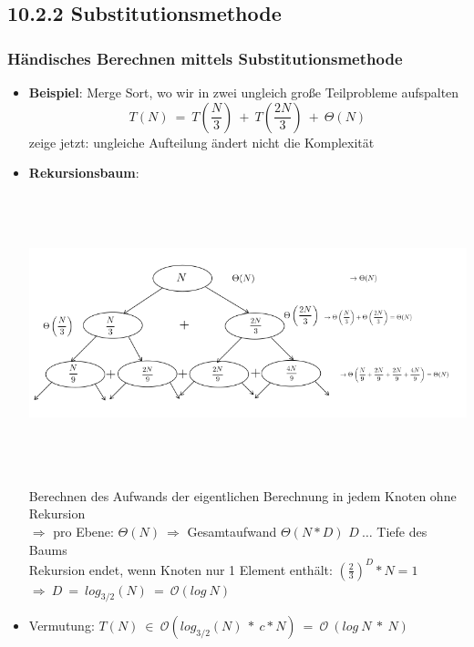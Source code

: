 \documentclass[11pt, fleqn]{scrreprt}
\begin{document}
	\subsection*{10.2.2 Substitutionsmethode}
	\subsubsection*{Händisches Berechnen mittels Substitutionsmethode}
	\begin{itemize}
		\item \textbf{Beispiel}: Merge Sort, wo wir in zwei ungleich große Teilprobleme aufspalten \\
		\[ T(N)\ =\ T\left(\frac{N}{3}\right)\ +\ T\left(\frac{2N}{3}\right)\ +\ \Theta(N)\]
		zeige jetzt: ungleiche Aufteilung ändert nicht die Komplexität
		\item \textbf{Rekursionsbaum}:\\
		\begin{center}
		\includegraphics[width=15cm,height=8cm,keepaspectratio]{./Pictures/Substitutionsmethode.png}
		\end{center}
		Berechnen des Aufwands der eigentlichen Berechnung in jedem Knoten ohne Rekursion\\
		$\Rightarrow$ pro Ebene: $\Theta(N) \ \Rightarrow$ Gesamtaufwand $\Theta(N*D)$ $D\ \dots$ Tiefe des Baums \\
		Rekursion endet, wenn Knoten nur 1 Element enthält: $\left(\frac{2}{3}\right)^D * N = 1$\\
		\hspace*{1cm} $\Rightarrow\ D\ =\ log_{3/2}(N)\ = \ \mathcal{O}(log\ N)$
		\item Vermutung: $T(N)\ \in\ \mathcal{O}(log_{3/2}(N)\ *\ c*N)\ =\ \mathcal{O}\ (log\ N\ *\ N)$\\

\end{itemize}
\end{document}
